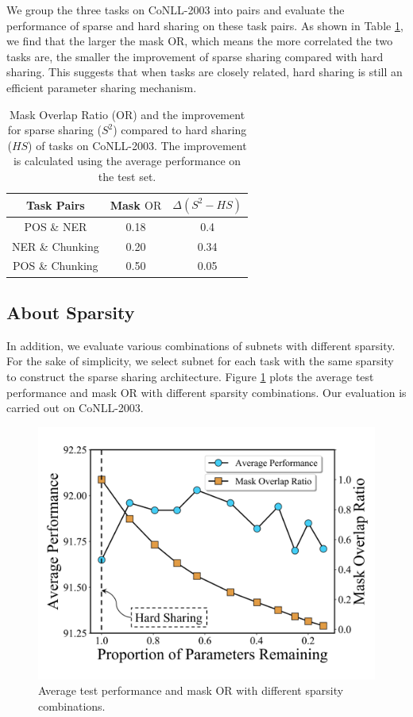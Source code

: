 \documentclass[letterpaper]{article} %
\begin{document}
We group the three tasks on CoNLL-2003 into pairs and evaluate the performance of sparse and hard sharing on these task pairs. As shown in Table \ref{tb:task_or}, we find that the larger the mask OR, which means the more correlated the two tasks are, the smaller the improvement of sparse sharing compared with hard sharing. This suggests that when tasks are closely related, hard sharing is still an efficient parameter sharing mechanism.

\begin{table}[!htbp]
\centering
\begin{tabular}{ccc}
\toprule
Task Pairs & Mask $\mathrm{OR}$ & $\Delta(S^2-HS)$ \\ \midrule
POS \& NER & 0.18 & 0.4 \\
NER \& Chunking & 0.20 & 0.34 \\
POS \& Chunking & 0.50 & 0.05 \\ \bottomrule
\end{tabular}
\caption{Mask Overlap Ratio ($\mathrm{OR}$) and the improvement for sparse sharing ($S^2$) compared to hard sharing ($HS$) of tasks on CoNLL-2003. The improvement is calculated using the average performance on the test set.}
\label{tb:task_or}
\end{table}

\subsection{About Sparsity}
In addition, we evaluate various combinations of subnets with different sparsity. For the sake of simplicity, we select subnet for each task with the same sparsity to construct the sparse sharing architecture. Figure \ref{fig:avg_or} plots the average test performance and mask OR with different sparsity combinations. Our evaluation is carried out on CoNLL-2003.

\begin{figure}[!htbp]
\centering
\includegraphics[width=.9\columnwidth]{3353_sparsity.png}
\caption{Average test performance and mask OR with different sparsity combinations.}
\label{fig:avg_or}
\end{figure}
\end{document}
